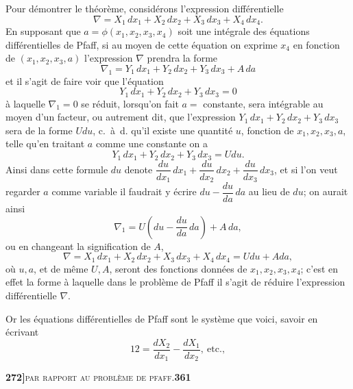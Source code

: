 \documentclass[11pt]{article}
\begin{document}
\medskip

Pour d\'emontrer le th\'eor\`eme, consid\'erons l'expression diff\'erentielle
\[
\nabla = X_1\, dx_1 + X_2\, dx_2 + X_3\, dx_3 + X_4\, dx_4.
\]
En supposant que $a = \phi(x_1, x_2, x_3, x_4)$ soit une int\'egrale des \'equations diff\'erentielles de Pfaff, si au moyen de cette \'equation on exprime $x_4$ en fonction de $(x_1, x_2, x_3, a)$ l'expression $\nabla$ prendra la forme
\[
\nabla_1 = Y_1\, dx_1 + Y_2\, dx_2 + Y_3\, dx_3 + A\, da
\]
et il s'agit de faire voir que l'\'equation
\[
Y_1\, dx_1 + Y_2\, dx_2 + Y_3\, dx_3 = 0
\]
\`a laquelle $\nabla_1 = 0$ se r\'eduit, lorsqu'on fait $a = $ constante, sera int\'egrable au moyen d'un facteur, ou autrement dit, que l'expression $Y_1\, dx_1 + Y_2\, dx_2 + Y_3\, dx_3$ sera de la forme $U du$, c.~\`a~d. qu'il existe une quantit\'e $u$, fonction de $x_1, x_2, x_3, a$, telle qu'en traitant $a$ comme une constante on a
\[
Y_1\, dx_1 + Y_2\, dx_2 + Y_3\, dx_3 = U du.
\]
Ainsi dans cette formule $du$ denote $\dfrac{du}{dx_1}\, dx_1 + \dfrac{du}{dx_2}\, dx_2 + \dfrac{du}{dx_3}\, dx_3$, et si l'on veut regarder $a$ comme variable il faudrait y \'ecrire $du - \dfrac{du}{da}\, da$ au lieu de $du$; on aurait ainsi
\[
\nabla_1 = U\!\left(du - \frac{du}{da}\, da\right) + A\, da,
\]
ou en changeant la signification de $A$,
\[
\nabla = X_1\, dx_1 + X_2\, dx_2 + X_3\, dx_3 + X_4\, dx_4 = U du + A da,
\]
o\`u $u, a$, et de m\^eme $U, A$, seront des fonctions donn\'ees de $x_1, x_2, x_3, x_4$; c'est en effet la forme \`a laquelle dans le probl\`eme de Pfaff il s'agit de r\'eduire l'expression diff\'erentielle $\nabla$.

\medskip

Or les \'equations diff\'erentielles de Pfaff sont le syst\`eme que voici, savoir en \'ecrivant
\[
12 = \frac{d X_2}{d x_1} - \frac{d X_1}{d x_2},\ \text{etc.},
\]

\newpage
\noindent\textbf{272]}\hfill\textsc{par rapport au probl\`eme de pfaff.}\hfill\textbf{361}

\medskip
\end{document}
